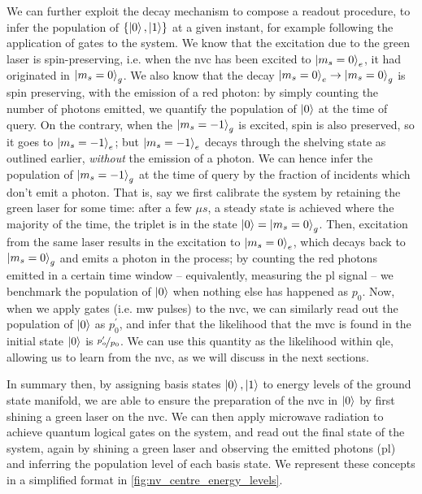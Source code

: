 We can further exploit the decay mechanism to compose a readout procedure, 
    to infer the population of $\{\ket{0}, \ket{1}\}$ at a given instant, 
    for example following the application of gates to the system. 
We know that the excitation due to the green laser is spin-preserving, 
    i.e. when the \gls{nvc} has been excited to $\ket{m_s=0}_e$, 
    it had originated in $\ket{m_s=0}_g$.
We also know that the decay $\ket{m_s=0}_e \rightarrow \ket{m_s=0}_g$ is spin preserving, with the emission of 
    a red photon: by simply counting the number of photons emitted, we quantify the population of $\ket{0}$
    at the time of query. 
On the contrary, when the $\ket{m_s=-1}_g$ is excited, spin is also preserved, 
    so it goes to $\ket{m_s=-1}_e$;
    but $\ket{m_s=-1}_e$ decays 
    through the shelving state as outlined earlier, 
    \emph{without} the emission of a photon. 
We can hence infer the population of $\ket{m_s=-1}_g$ at the time of query by the fraction of incidents which don't emit a photon.
That is, say we first calibrate the system by retaining the green laser for some time: 
    after a few $\mu s$, a steady state is achieved where the majority of the time, the triplet is in the state $\ket{0} = \ket{m_s=0}_g$. 
Then, excitation from the same laser results in the excitation to $\ket{m_s=0}_e$, 
    which decays back to $\ket{m_s=0}_g$ and emits a photon in the process; 
    by counting the red photons emitted in a certain time window -- equivalently, measuring the \gls{pl} signal -- 
    we benchmark the population of $\ket{0}$ when nothing else has happened as $p_0$. 
Now, when we apply gates (i.e. \gls{mw} pulses) to the \gls{nvc}, 
    we can similarly read out the population of $\ket{0}$ as $p_0^{\prime}$,
    and infer that the likelihood that the \gls{mvc} is found in the initial state $\ket{0}$ is $\nicefrac{p_o^{\prime}}{p_0}$. 
We can use this quantity as the \gls{likelihood} within \gls{qle}, allowing us to learn from the \gls{nvc},
    as we will discuss in the next sections. 
\par 

In summary then, by assigning basis states $\ket{0}, \ket{1}$ to energy levels of the ground state manifold, 
    we are able to ensure the preparation of the \gls{nvc} in $\ket{0}$ by first shining a green laser on the \gls{nvc}. 
We can then apply microwave radiation to achieve quantum logical gates on the system, 
    and read out the final state of the system, again by shining a green laser
    and observing the emitted photons (\gls{pl}) and inferring the population level of each basis state. 
We represent these concepts in a simplified format in \cref{fig:nv_centre_energy_levels}. 


